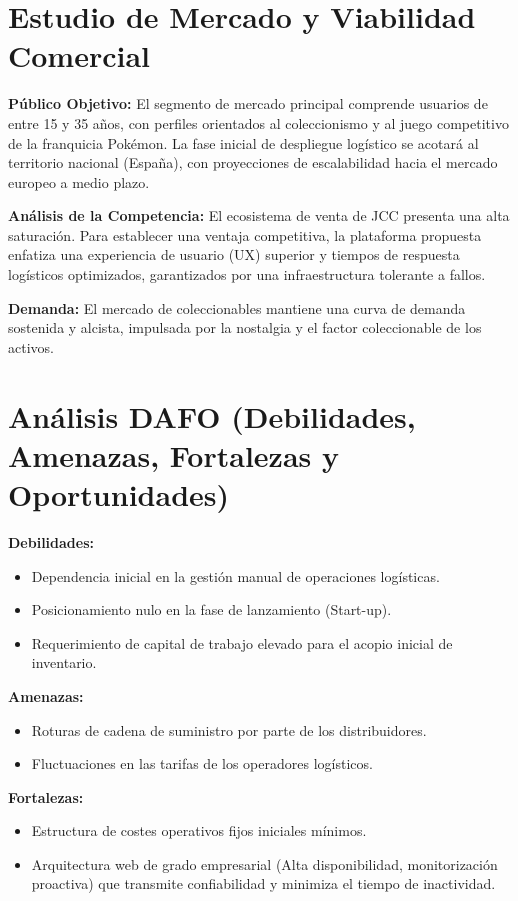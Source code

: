 \documentclass[12pt,a4paper]{article}
\begin{document}
\newpage
\section{Estudio de Mercado y Viabilidad Comercial}
\label{EstudioMercado}

\textbf{Público Objetivo:} El segmento de mercado principal comprende usuarios de entre 15 y 35 años, con perfiles orientados al coleccionismo y al juego competitivo de la franquicia Pokémon. La fase inicial de despliegue logístico se acotará al territorio nacional (España), con proyecciones de escalabilidad hacia el mercado europeo a medio plazo.

\textbf{Análisis de la Competencia:} El ecosistema de venta de JCC presenta una alta saturación. Para establecer una ventaja competitiva, la plataforma propuesta enfatiza una experiencia de usuario (UX) superior y tiempos de respuesta logísticos optimizados, garantizados por una infraestructura tolerante a fallos.

\textbf{Demanda:} El mercado de coleccionables mantiene una curva de demanda sostenida y alcista, impulsada por la nostalgia y el factor coleccionable de los activos.

\section{Análisis DAFO (Debilidades, Amenazas, Fortalezas y Oportunidades)}
\label{DAFO}

\textbf{Debilidades:}
\begin{itemize}
    \item Dependencia inicial en la gestión manual de operaciones logísticas.
    \item Posicionamiento nulo en la fase de lanzamiento (Start-up).
    \item Requerimiento de capital de trabajo elevado para el acopio inicial de inventario.
\end{itemize}

\textbf{Amenazas:}
\begin{itemize}
    \item Roturas de cadena de suministro por parte de los distribuidores.
    \item Fluctuaciones en las tarifas de los operadores logísticos.
\end{itemize}

\textbf{Fortalezas:}
\begin{itemize}
    \item Estructura de costes operativos fijos iniciales mínimos.
    \item Arquitectura web de grado empresarial (Alta disponibilidad, monitorización proactiva) que transmite confiabilidad y minimiza el tiempo de inactividad.
\end{itemize}
\end{document}
